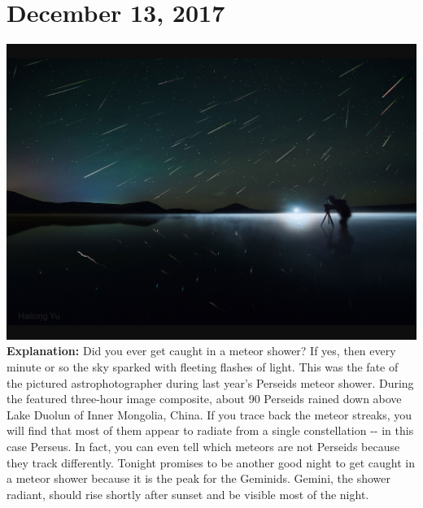 \documentclass{article}%
\begin{document}
\section*{December 13, 2017}%
\includegraphics[width=\textwidth]{../lib/pictures/171213.jpg}%
\textbf{\newline%
\newline%
Explanation:\newline%
}%
    Did you ever get caught in a meteor shower?  If yes, then every minute or so the sky sparked with fleeting flashes of light.  This was the fate of the pictured astrophotographer during last year's Perseids  meteor shower.  During the featured three{-}hour image composite,  about 90 Perseids rained down above Lake Duolun of  Inner Mongolia,  China.  If you trace back the meteor streaks, you will find that most of them  appear to radiate from a single constellation {-}{-} in this case  Perseus.  In fact, you can even tell which meteors are not  Perseids because they track differently.  Tonight promises to be another good night to get caught in a meteor shower because it is the peak for the Geminids.  Gemini, the shower radiant,  should rise shortly after sunset and  be visible most of the night.%
\newpage

%
\end{document}

